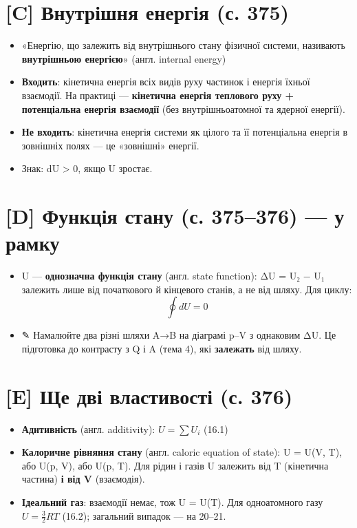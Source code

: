 \documentclass[11pt,a4paper,oneside]{book}
\newcommand{\pen}{{\sffamily\color{accent}✎}}
\begin{document}
\section*{[C] Внутрішня енергія (с. 375)}
\begin{itemize}
\item «Енергію, що залежить від внутрішнього стану фізичної системи, називають \textbf{внутрішньою енергією}» (англ. internal energy)
\item \textbf{Входить}: кінетична енергія всіх видів руху частинок і енергія їхньої взаємодії. На практиці — \textbf{кінетична енергія теплового руху + потенціальна енергія взаємодії} (без внутрішньоатомної та ядерної енергії).
\item \textbf{Не входить}: кінетична енергія системи як цілого та її потенціальна енергія в зовнішніх полях — це «зовнішні» енергії.
\item Знак: dU > 0, якщо U зростає.
\end{itemize}

\section*{[D] Функція стану (с. 375–376) — у рамку}
\begin{itemize}
\item U — \textbf{однозначна функція стану} (англ. state function): ΔU = U₂ − U₁ залежить лише від початкового й кінцевого станів, а не від шляху. Для циклу:
\[\oint dU = 0\]
\item \pen{} Намалюйте два різні шляхи A→B на діаграмі p–V з однаковим ΔU. Це підготовка до контрасту з Q і A (тема 4), які \textbf{залежать} від шляху.
\end{itemize}

\section*{[E] Ще дві властивості (с. 376)}
\begin{itemize}
\item \textbf{Адитивність} (англ. additivity): $U = \sum U_i$ (16.1)
\item \textbf{Калоричне рівняння стану} (англ. caloric equation of state): U = U(V, T), або U(p, V), або U(p, T). Для рідин і газів U залежить від T (кінетична частина) \textbf{і від V} (взаємодія).
\item \textbf{Ідеальний газ}: взаємодії немає, тож U = U(T). Для одноатомного газу $U = \tfrac32RT$ (16.2); загальний випадок — на 20–21.
\end{itemize}
\end{document}
